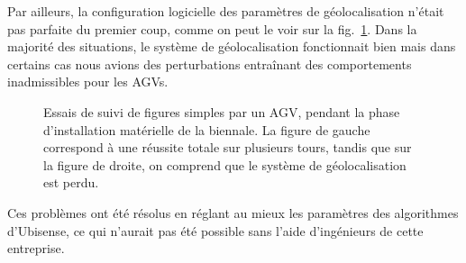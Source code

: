 \documentclass[french,A4paper,]{book}
\begin{document}
Par ailleurs, la configuration logicielle des paramètres de
géolocalisation n'était pas parfaite du premier coup, comme on peut le
voir sur la fig.~\ref{fig:carres}. Dans la majorité des situations, le
système de géolocalisation fonctionnait bien mais dans certains cas nous
avions des perturbations entraînant des comportements inadmissibles pour
les AGVs.

\begin{figure}
\centering

\hspace*{\fill}
\hfill%
\hspace*{\fill}

\caption{Essais de suivi de figures simples par un AGV, pendant la phase
d'installation matérielle de la biennale. La figure de gauche correspond
à une réussite totale sur plusieurs tours, tandis que sur la figure de
droite, on comprend que le système de géolocalisation est perdu.}

\label{fig:carres}

\end{figure}

Ces problèmes ont été résolus en réglant au mieux les paramètres des
algorithmes d'Ubisense, ce qui n'aurait pas été possible sans l'aide
d'ingénieurs de cette entreprise.
\end{document}
